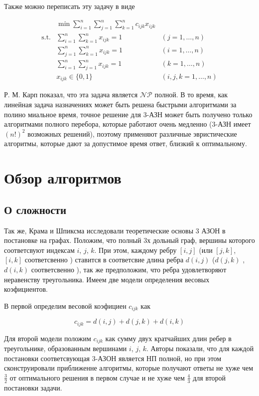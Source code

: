 \documentclass[14pt,a4paper]{article}
\begin{document}
Также можно переписать эту задачу в виде

\begin{eqnarray*}
  & \min \displaystyle \sum^n_{i = 1} \displaystyle \sum^n_{j = 1} \displaystyle \sum^n_{k = 1}
  c_{ijk} x_{ijk} \\
  \text{s.t.}
  &\displaystyle \sum^n_{i = 1} \displaystyle \sum^n_{k = 1} x_{ijk} = 1  &(j = 1, \ldots, n) \\
  &\displaystyle \sum^n_{j = 1} \displaystyle \sum^n_{k = 1} x_{ijk} = 1  &(i = 1, \ldots, n) \\
  &\displaystyle \sum^n_{i = 1} \displaystyle \sum^n_{j = 1} x_{ijk} = 1  &(k = 1, \ldots, n) \\
  & x_{ijk} \in \{ 0, 1 \} &(i,j,k = 1, \ldots, n)
\end{eqnarray*}

Р. М. Карп показал, что эта задача является $\mathcal{NP}$ полной. В то время,
как линейная задача назначениях может быть решена быстрыми алгоритмами за полино
миальное время, точное решение для 3-АЗН может быть получено только алгоритмами полного перебора, которые
работают очень медленно (3-АЗН имеет $(n!)^2$ возможных решений), поэтому
применяют различные эвристические алгоритмы, которые дают за допустимое время
ответ, близкий к оптимальному.

\section{Обзор алгоритмов}

\subsection{О сложности}
Так же, Крама и Шпиксма исследовали теоретические
основы 3 АЗОН
в постановке на графах. Положим, что полный
3х дольный граф, вершины которого соответсвуют
индексам $i$, $j$, $k$. При этом, каждому ребру
$\left[ i, j \right]$ (или $\left[ j, k \right]$,
$\left[ i, k \right]$ соответсвенно )
ставится в соответсвие длина ребра $d \left( i, j
\right)$ ($d \left( j, k \right)$ , $d \left( i,k
\right)$ соответсвенно ), так же предположим,
что ребра удовлетворяют неравенству треугольника.
Имеем две модели определения весовых коэфициентов.

В первой определим весовой коэфициен $c_{ijk}$ как

$$
	c_{ijk} =
	d \left( i, j \right) +
	d \left( j, k \right) +
	d \left( i, k \right)
$$

Для второй модели положим $c_{ijk}$ как сумму двух
кратчайших длин ребер в треугольнике, образованным
вершинами $i$, $j$, $k$. Авторы показали, что для
каждой постановки соответсвующая 3-АЗОН является
НП полной, но при этом сконструировали
приближенне алгоритмы, которые получают ответы
не хуже чем $\frac{3}{2}$ от оптимального решения
в первом случае и не хуже чем $\frac{4}{3}$ для
второй постановки задачи.
\end{document}
